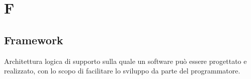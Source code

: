 \section{F}
\subsection{Framework}%
Architettura logica di supporto sulla quale un software può essere progettato e realizzato, con lo scopo di facilitare lo sviluppo da parte del programmatore.
\clearpage